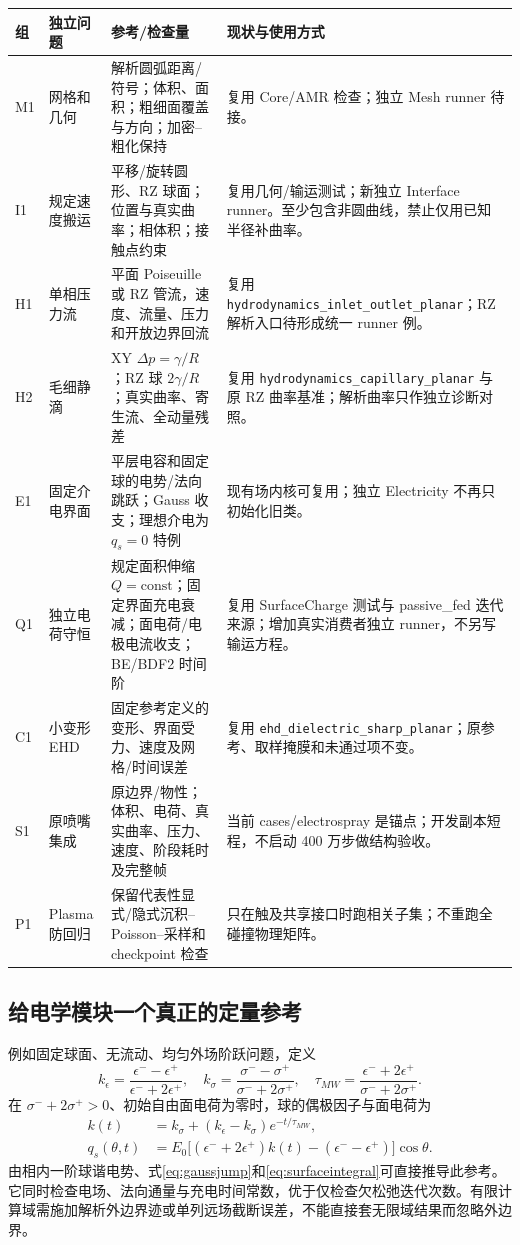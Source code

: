 \documentclass[UTF8,a4paper,11pt,fontset=fandol]{ctexart}
\numberwithin{equation}{section}
\newcommand{\code}[1]{\nolinkurl{#1}}
\begin{document}
\begin{longtable}{@{}P{.08\textwidth}P{.19\textwidth}P{.34\textwidth}P{.31\textwidth}@{}}
\toprule 组 & 独立问题 & 参考/检查量 & 现状与使用方式\\\midrule\endhead
M1 & 网格和几何 & 解析圆弧距离/符号；体积、面积；粗细面覆盖与方向；加密--粗化保持 & 复用 Core/AMR 检查；独立 Mesh runner 待接。\\
I1 & 规定速度搬运 & 平移/旋转圆形、RZ 球面；位置与真实曲率；相体积；接触点约束 & 复用几何/输运测试；新独立 Interface runner。至少包含非圆曲线，禁止仅用已知半径补曲率。\\
H1 & 单相压力流 & 平面 Poiseuille 或 RZ 管流，速度、流量、压力和开放边界回流 & 复用 \code{hydrodynamics_inlet_outlet_planar}；RZ 解析入口待形成统一 runner 例。\\
H2 & 毛细静滴 & XY $\Delta p=\gamma/R$；RZ 球 $2\gamma/R$；真实曲率、寄生流、全动量残差 & 复用 \code{hydrodynamics_capillary_planar} 与原 RZ 曲率基准；解析曲率只作独立诊断对照。\\
E1 & 固定介电界面 & 平层电容和固定球的电势/法向跳跃；Gauss 收支；理想介电为 $q_s=0$ 特例 & 现有场内核可复用；独立 Electricity 不再只初始化旧类。\\
Q1 & 独立电荷守恒 & 规定面积伸缩 $Q=\mathrm{const}$；固定界面充电衰减；面电荷/电极电流收支；BE/BDF2 时间阶 & 复用 SurfaceCharge 测试与 passive\_fed 迭代来源；增加真实消费者独立 runner，不另写输运方程。\\
C1 & 小变形 EHD & 固定参考定义的变形、界面受力、速度及网格/时间误差 & 复用 \code{ehd_dielectric_sharp_planar}；原参考、取样掩膜和未通过项不变。\\
S1 & 原喷嘴集成 & 原边界/物性；体积、电荷、真实曲率、压力、速度、阶段耗时及完整帧 & 当前 cases/electrospray 是锚点；开发副本短程，不启动 400 万步做结构验收。\\
P1 & Plasma 防回归 & 保留代表性显式/隐式沉积--Poisson--采样和 checkpoint 检查 & 只在触及共享接口时跑相关子集；不重跑全碰撞物理矩阵。\\
\bottomrule
\end{longtable}

\subsection{给电学模块一个真正的定量参考}
例如固定球面、无流动、均匀外场阶跃问题，定义
\begin{equation}
 k_\epsilon=\frac{\epsilon^- -\epsilon^+}{\epsilon^-+2\epsilon^+},\quad
 k_\sigma=\frac{\sigma^- -\sigma^+}{\sigma^-+2\sigma^+},\quad
 \tau_{MW}=\frac{\epsilon^-+2\epsilon^+}{\sigma^-+2\sigma^+}.
\end{equation}
在 $\sigma^-+2\sigma^+>0$、初始自由面电荷为零时，球的偶极因子与面电荷为
\begin{align}
 k(t)&=k_\sigma+(k_\epsilon-k_\sigma)e^{-t/\tau_{MW}},\\
 q_s(\theta,t)&=E_0\big[(\epsilon^-+2\epsilon^+)k(t)-(\epsilon^--\epsilon^+)\big]\cos\theta.
\end{align}
由相内一阶球谐电势、式\eqref{eq:gaussjump}和\eqref{eq:surfaceintegral}可直接推导此参考。它同时检查电场、法向通量与充电时间常数，优于仅检查欠松弛迭代次数。有限计算域需施加解析外边界迹或单列远场截断误差，不能直接套无限域结果而忽略外边界。
\end{document}
